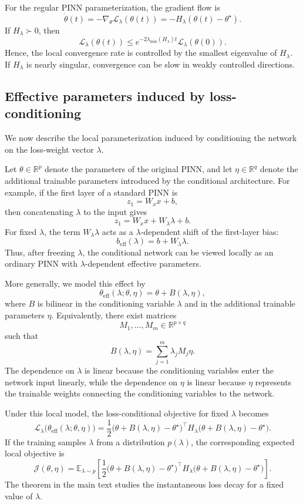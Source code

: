 \documentclass{article}
\theoremstyle{plain}
\theoremstyle{definition}
\theoremstyle{remark}
\begin{document}
For the regular PINN parameterization, the gradient flow is
\[
    \dot{\theta}(t)
    =
    -
    \nabla_\theta
    \mathcal{L}_{\lambda}(\theta(t))
    =
    -
    H_\lambda
    (\theta(t)-\theta^\star).
\]
If $H_\lambda \succ 0$, then
\[
    \mathcal{L}_{\lambda}(\theta(t))
    \leq
    e^{-2\lambda_{\min}(H_\lambda)t}
    \mathcal{L}_{\lambda}(\theta(0)).
\]
Hence, the local convergence rate is controlled by the smallest
eigenvalue of $H_\lambda$. If $H_\lambda$ is nearly singular, convergence
can be slow in weakly controlled directions.

\subsection{Effective parameters induced by loss-conditioning}

We now describe the local parameterization induced by conditioning the
network on the loss-weight vector $\lambda$.

Let $\theta \in \mathbb{R}^p$ denote the parameters of the original PINN,
and let $\eta \in \mathbb{R}^q$ denote the additional trainable
parameters introduced by the conditional architecture. For example, if
the first layer of a standard PINN is
\[
    z_1 = W_x x + b,
\]
then concatenating $\lambda$ to the input gives
\[
    z_1 = W_x x + W_\lambda \lambda + b .
\]
For fixed $\lambda$, the term $W_\lambda \lambda$ acts as a
$\lambda$-dependent shift of the first-layer bias:
\[
    b_{\mathrm{eff}}(\lambda)
    =
    b + W_\lambda \lambda .
\]
Thus, after freezing $\lambda$, the conditional network can be viewed
locally as an ordinary PINN with $\lambda$-dependent effective
parameters.

More generally, we model this effect by
\[
    \theta_{\mathrm{eff}}(\lambda;\theta,\eta)
    =
    \theta + B(\lambda,\eta),
\]
where $B$ is bilinear in the conditioning variable $\lambda$ and in the
additional trainable parameters $\eta$. Equivalently, there exist
matrices
\[
    M_1,\dots,M_m \in \mathbb{R}^{p \times q}
\]
such that
\[
    B(\lambda,\eta)
    =
    \sum_{j=1}^m \lambda_j M_j \eta .
\]
The dependence on $\lambda$ is linear because the conditioning variables
enter the network input linearly, while the dependence on $\eta$ is
linear because $\eta$ represents the trainable weights connecting the
conditioning variables to the network.

Under this local model, the loss-conditional objective for fixed
$\lambda$ becomes
\[
    \mathcal{L}_{\lambda}
    \bigl(
        \theta_{\mathrm{eff}}(\lambda;\theta,\eta)
    \bigr)
    =
    \frac12
    \bigl(
        \theta + B(\lambda,\eta)-\theta^\star
    \bigr)^\top
    H_\lambda
    \bigl(
        \theta + B(\lambda,\eta)-\theta^\star
    \bigr).
\]
If the training samples $\lambda$ from a distribution $p(\lambda)$, the
corresponding expected local objective is
\[
    \mathcal{J}(\theta,\eta)
    =
    \mathbb{E}_{\lambda \sim p}
    \left[
        \frac12
        \bigl(
            \theta + B(\lambda,\eta)-\theta^\star
        \bigr)^\top
        H_\lambda
        \bigl(
            \theta + B(\lambda,\eta)-\theta^\star
        \bigr)
    \right].
\]
The theorem in the main text studies the instantaneous loss decay for a
fixed value of $\lambda$.
\end{document}
